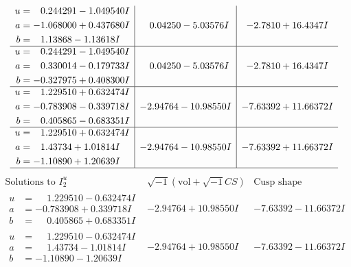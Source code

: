 \documentclass[1p]{elsarticle_modified}
\theoremstyle{definition}
\newcommand{\I}{\sqrt{-1}}
\begin{document}
$$\begin{array}{c|c|c}
\begin{aligned}
u &= \phantom{-}0.244291 - 1.049540 I \\
a &= -1.068000 + 0.437680 I \\
b &= \phantom{-}1.13868 - 1.13618 I\end{aligned}
 & \phantom{-}0.04250 - 5.03576 I & -2.7810 + 16.4347 I \\ \hline\begin{aligned}
u &= \phantom{-}0.244291 - 1.049540 I \\
a &= \phantom{-}0.330014 - 0.179733 I \\
b &= -0.327975 + 0.408300 I\end{aligned}
 & \phantom{-}0.04250 - 5.03576 I & -2.7810 + 16.4347 I \\ \hline\begin{aligned}
u &= \phantom{-}1.229510 + 0.632474 I \\
a &= -0.783908 - 0.339718 I \\
b &= \phantom{-}0.405865 - 0.683351 I\end{aligned}
 & -2.94764 - 10.98550 I & -7.63392 + 11.66372 I \\ \hline\begin{aligned}
u &= \phantom{-}1.229510 + 0.632474 I \\
a &= \phantom{-}1.43734 + 1.01814 I \\
b &= -1.10890 + 1.20639 I\end{aligned}
 & -2.94764 - 10.98550 I & -7.63392 + 11.66372 I\\
 \hline 
 \end{array}$$\newpage$$\begin{array}{c|c|c}  
\text{Solutions to }I^u_{2}& \I (\text{vol} + \sqrt{-1}CS) & \text{Cusp shape}\\
 \hline 
\begin{aligned}
u &= \phantom{-}1.229510 - 0.632474 I \\
a &= -0.783908 + 0.339718 I \\
b &= \phantom{-}0.405865 + 0.683351 I\end{aligned}
 & -2.94764 + 10.98550 I & -7.63392 - 11.66372 I \\ \hline\begin{aligned}
u &= \phantom{-}1.229510 - 0.632474 I \\
a &= \phantom{-}1.43734 - 1.01814 I \\
b &= -1.10890 - 1.20639 I\end{aligned}
 & -2.94764 + 10.98550 I & -7.63392 - 11.66372 I \\ \hline\begin{aligned}

\end{aligned}
\end{array}$$
\end{document}
